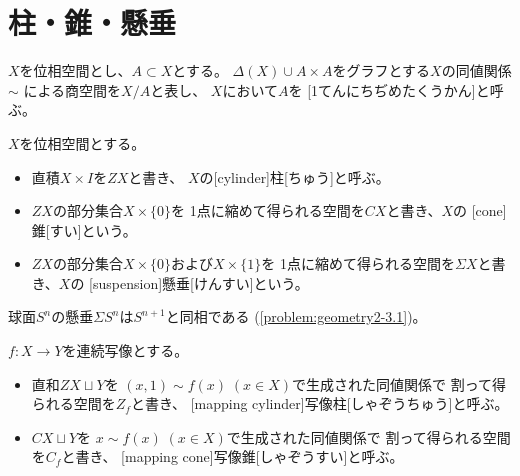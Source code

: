 \documentclass[report]{jlreq}
\begin{document}
%
\section{柱・錐・懸垂}

\begin{definition}[1点に縮めた空間]
    $X$を位相空間とし、$A \subset X$とする。
    $\Delta(X) \cup A \times A$をグラフとする$X$の同値関係$\sim$\footnotemark
    による商空間を$X/A$と表し、
    $X$において$A$を
    [1てんにちぢめたくうかん]と呼ぶ。
\end{definition}


\begin{definition}[柱、錐、懸垂]
    $X$を位相空間とする。
    \begin{itemize}
        \item 直積$X \times I$を$ZX$と書き、
            $X$の[cylinder]{柱}[ちゅう]と呼ぶ。
        \item $ZX$の部分集合$X \times \{0\}$を
            1点に縮めて得られる空間を$CX$と書き、$X$の
            [cone]{錐}[すい]という。
        \item $ZX$の部分集合$X \times \{0\}$および$X \times \{1\}$を
            1点に縮めて得られる空間を$\Sigma X$と書き、$X$の
            [suspension]{懸垂}[けんすい]という。
    \end{itemize}
\end{definition}

\begin{example}[柱、錐、懸垂の例]
    \TODO{}
\end{example}

\begin{example}[球面の懸垂]
    球面$S^n$の懸垂$\Sigma S^n$は$S^{n + 1}$と同相である
    (\cref{problem:geometry2-3.1})。
\end{example}

\begin{definition}
    $f \colon X \to Y$を連続写像とする。
    \begin{itemize}
        \item 直和$ZX \sqcup Y$を
            $(x, 1) \sim f(x)\; (x \in X)$で生成された同値関係で
            割って得られる空間を$Z_f$と書き、
            [mapping cylinder]{写像柱}[しゃぞうちゅう]と呼ぶ。
        \item $CX \sqcup Y$を
            $x \sim f(x)\; (x \in X)$で生成された同値関係で
            割って得られる空間を$C_f$と書き、
            [mapping cone]{写像錐}[しゃぞうすい]と呼ぶ。
    \end{itemize}
\end{definition}
\end{document}
